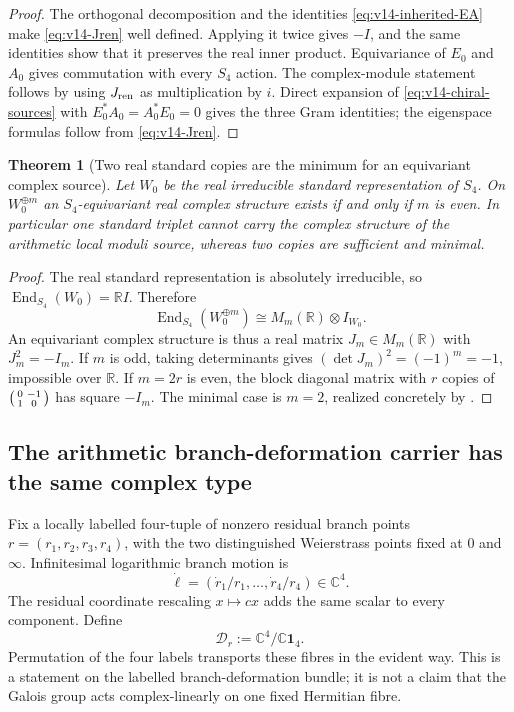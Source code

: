 \documentclass[11pt]{article}
\newtheorem{theorem}{Theorem}[section]
\theoremstyle{definition}
\theoremstyle{remark}
\newcommand{\C}{\mathbb C}
\newcommand{\R}{\mathbb R}
\newcommand{\End}{\operatorname{End}}
\newcommand{\one}{\mathbf1}
\begin{document}
\begin{proof}
The orthogonal decomposition and the identities
\eqref{eq:v14-inherited-EA} make \eqref{eq:v14-Jren} well defined.  Applying
it twice gives $-I$, and the same identities show that it preserves the real
inner product.  Equivariance of $E_0$ and $A_0$ gives commutation with every
$S_4$ action.  The complex-module statement follows by using $J_{\rm ren}$ as
multiplication by $i$.  Direct expansion of
\eqref{eq:v14-chiral-sources} with
$E_0^*A_0=A_0^*E_0=0$ gives the three Gram identities; the eigenspace formulas
follow from \eqref{eq:v14-Jren}.
\end{proof}

\begin{theorem}[Two real standard copies are the minimum for an equivariant complex source]
\label{thm:v14-minimal-two-copies}
Let $W_0$ be the real irreducible standard representation of $S_4$.  On
$W_0^{\oplus m}$ an $S_4$-equivariant real complex structure exists if and
only if $m$ is even.  In particular one standard triplet cannot carry the
complex structure of the arithmetic local moduli source, whereas two copies
are sufficient and minimal.
\end{theorem}

\begin{proof}
The real standard representation is absolutely irreducible, so
$\End_{S_4}(W_0)=\R I$.  Therefore
\[
 \End_{S_4}(W_0^{\oplus m})\cong M_m(\R)\otimes I_{W_0}.
\]
An equivariant complex structure is thus a real matrix $J_m\in M_m(\R)$ with
$J_m^2=-I_m$.  If $m$ is odd, taking determinants gives
$(\det J_m)^2=(-1)^m=-1$, impossible over $\R$.  If $m=2r$ is even, the block
diagonal matrix with $r$ copies of
$\begin{psmallmatrix}0&-1\\1&0\end{psmallmatrix}$ has square $-I_m$.
The minimal case is $m=2$, realized concretely by
.
\end{proof}

\subsection{The arithmetic branch-deformation carrier has the same complex type}
Fix a locally labelled four-tuple of nonzero residual branch points
$r=(r_1,r_2,r_3,r_4)$, with the two distinguished Weierstrass points fixed at
$0$ and $\infty$.  Infinitesimal logarithmic branch motion is
\[
 \dot\ell=(\dot r_1/r_1,\ldots,\dot r_4/r_4)\in\C^4.
\]
The residual coordinate rescaling $x\mapsto cx$ adds the same scalar to every
component.  Define
\begin{equation}
 \boxed{
 \mathcal D_r:=\C^4/\C\one_4.}
 \label{eq:v14-branch-tangent}
\end{equation}
Permutation of the four labels transports these fibres in the evident way.
This is a statement on the labelled branch-deformation bundle; it is not a
claim that the Galois group acts complex-linearly on one fixed Hermitian
fibre.
\end{document}
